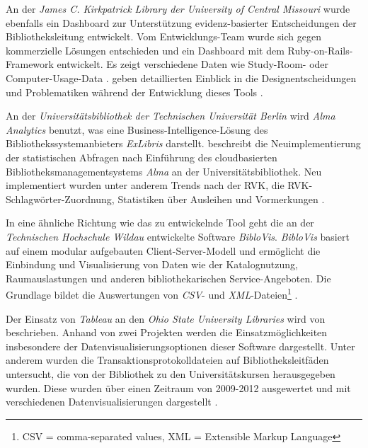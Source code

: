 An der \textit{James C. Kirkpatrick Library der University of Central Missouri} wurde ebenfalls ein Dashboard 
zur Unterstützung evidenz-basierter Entscheidungen der Bibliotheksleitung entwickelt. 
Vom Entwicklungs-Team wurde sich gegen kommerzielle Lösungen entschieden und ein Dashboard mit dem Ruby-on-Rails-Framework entwickelt. Es zeigt verschiedene Daten wie Study-Room- oder Computer-Usage-Data \cite[vgl.][]{james_c_kirkpatrick_library_jckl_2020}.
\citeauthor{horne-popp_if_2018} geben detaillierten Einblick in die Designentscheidungen und Problematiken während der Entwicklung dieses Tools \cite[vgl.][S. 194 ff.]{horne-popp_if_2018}. 

An der \textit{Universitätsbibliothek der Technischen Universität Berlin} wird \textit{Alma Analytics} benutzt, was eine Business-Intelligence-Lösung des Bibliothekssystemanbieters \textit{ExLibris} darstellt. 
 beschreibt die Neuimplementierung der statistischen Abfragen nach Einführung des cloudbasierten Bibliotheksmanagementsystems \textit{Alma} an der Universitätsbibliothek.
Neu implementiert wurden unter anderem Trends nach der \acrfull{RVK}, die RVK-Schlagwörter-Zuordnung, Statistiken über Ausleihen und Vormerkungen \cite[vgl.][53]{golas_statistische_2018}.

In eine ähnliche Richtung wie das zu entwickelnde Tool geht die an der \textit{Technischen Hochschule Wildau} entwickelte Software \textit{BibloVis}.
\textit{BibloVis} basiert auf einem modular aufgebauten Client-Server-Modell und ermöglicht die Einbindung und Visualisierung von Daten wie
der Katalognutzung, Raumauslastungen und  anderen bibliothekarischen Service-Angeboten. Die Grundlage bildet die Auswertungen von \textit{\acrshort{CSV}}-
und \textit{\acrshort{XML}}-Dateien\footnote{CSV = comma-separated values, XML = Extensible Markup Language} \cite[vgl.][]{block_biblovis_2015}.


Der Einsatz von \textit{Tableau} an den \textit{Ohio State University Libraries} wird von  beschrieben. 
Anhand von zwei Projekten werden die Einsatzmöglichkeiten insbesondere der Datenvisualisierungsoptionen 
dieser Software dargestellt. Unter anderem wurden die Transaktionsprotokolldateien auf Bibliotheksleitfäden untersucht, 
die von der Bibliothek zu den Universitätskursen herausgegeben wurden.  Diese wurden über einen Zeitraum von 2009-2012 ausgewertet und 
mit verschiedenen Datenvisualisierungen dargestellt \cite[vgl.][S. 469 f.]{murphy_data_2013}.

